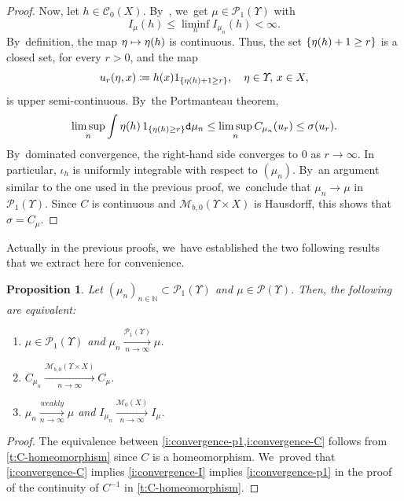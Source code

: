 \documentclass[10pt]{amsart}
\newcommand\mto{\mathchoice{\longmapsto}{\mapsto}{\mapsto}{\mapsto}}
\newtheorem{proposition}[theorem]{Proposition}
\theoremstyle{definition}
\theoremstyle{remark}
\DeclarePairedDelimiter{\set}{\lbrace}{\rbrace}
\begin{document}
\begin{proof}
Now, let $h \in \mathscr{C}_{0}(X)$.
By~\cite[Lem.\,5.11]{KallenbergFMP}, we~get $\mu \in \mathscr{P}_{1}(\varUpsilon)$ with
\begin{equation*}
I_{\mu}(h) \leq \liminf_{n} I_{\mu_{n}}(h) < \infty.
\end{equation*}
By~definition, the map $\eta \mto \eta(h)$ is continuous.
Thus, the set $\set{ \eta(h) + 1 \geq r }$ is a closed set, for every $r > 0$,
and the map
\begin{equation*}
u_{r}(\eta, x) \coloneq h(x) 1_{\set{\eta(h) + 1 \geq r}}, \quad \eta \in \varUpsilon,\, x \in X,
\end{equation*}
is upper semi-continuous.
By~the Portmanteau theorem,
\begin{equation*}
\limsup_{n} \int \eta(h)\, 1_{\set{\eta(h) \geq r}} \mathtt{d} \mu_{n} \leq \limsup_{n} C_{\mu_{n}}(u_{r}) \leq \sigma(u_{r}).
\end{equation*}
By~dominated convergence, the right-hand side converges to $0$ as $r \to \infty$.
In particular, $\iota_{h}$ is uniformly integrable with respect to $(\mu_{n})$.
By~an argument similar to the one used in the previous proof, we~conclude that $\mu_{n} \to \mu$ in $\mathscr{P}_{1}(\varUpsilon)$.
Since $C$ is continuous and $\mathscr{M}_{b,0}(\varUpsilon \times X)$ is Hausdorff, this shows that $\sigma = C_{\mu}$.
\end{proof}

Actually in the previous proofs, we~have established the two following results that we extract here for convenience.
\begin{proposition}\label{t:p1-convergence}
Let $(\mu_{n})_{n \in \mathbb{N}} \subset \mathscr{P}_{1}(\varUpsilon)$ and $\mu \in \mathscr{P}(\varUpsilon)$.
Then, the following are equivalent:
\begin{enumerate}[$(\rm i)$, wide]
\item\label{i:convergence-p1} $\mu \in \mathscr{P}_{1}(\varUpsilon)$ and $\mu_{n} \xrightarrow[n \to \infty]{\mathscr{P}_{1}(\varUpsilon)} \mu$.
\item\label{i:convergence-C} $C_{\mu_{n}} \xrightarrow[n \to \infty]{\mathscr{M}_{b,0}(\varUpsilon \times X)} C_{\mu}$.
\item\label{i:convergence-I} $\mu_{n} \xrightarrow[n \to \infty]{weakly} \mu$ and $I_{\mu_{n}} \xrightarrow[n \to \infty]{\mathscr{M}_{0}(X)} I_{\mu}$.
\end{enumerate}
\end{proposition}

\begin{proof}
The equivalence between \cref{i:convergence-p1,i:convergence-C} follows from \cref{t:C-homeomorphism} since $C$ is a homeomorphism. We~proved that \cref{i:convergence-C} implies \cref{i:convergence-I} implies \cref{i:convergence-p1} in the proof of the continuity of $C^{-1}$ in \cref{t:C-homeomorphism}.
\end{proof}
\end{document}
